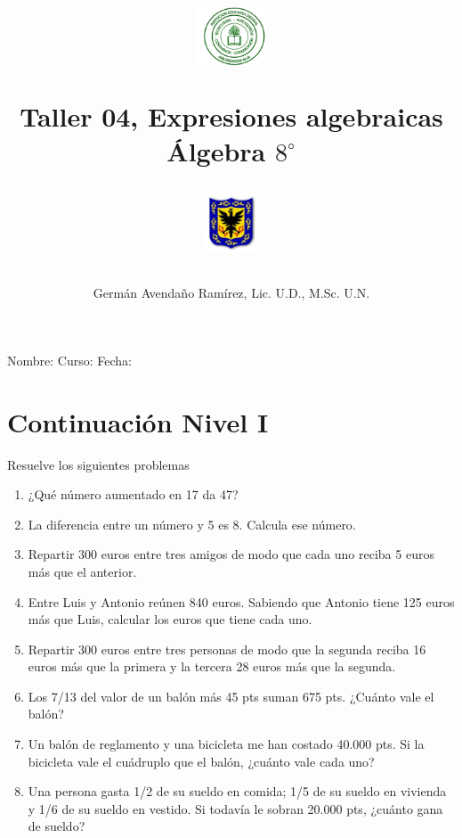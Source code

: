 \documentclass[10pt,twoside]{article}
\author{Germ\'an Avenda\~no Ram\'irez, Lic. U.D., M.Sc. U.N.}
\title{\begin{minipage}{.2\textwidth}
\includegraphics[height=1.75cm]{Images/logo-colegio.png}\end{minipage}
\begin{minipage}{.55\textwidth}
\begin{center}
Taller 04, Expresiones algebraicas \\
Álgebra $8^{\circ}$
\end{center}
\end{minipage}\hfill
\begin{minipage}{.2\textwidth}
\includegraphics[height=1.75cm]{Images/logo-sed.png} 
\end{minipage}}
\date{}
\begin{document}
\maketitle
Nombre: \hrulefill Curso: \underline{\hspace*{44pt}} Fecha: \underline{\hspace*{2.5cm}}
\section*{Continuaci\'{o}n Nivel I}
Resuelve los siguientes problemas
\begin{enumerate}
\item ¿Qué número aumentado en 17 da 47?
\item La diferencia entre un número y 5 es 8. Calcula ese número.
\item Repartir 300 euros entre tres amigos de modo que cada uno reciba 5 euros más que el anterior.
\item Entre Luis y Antonio reúnen 840 euros. Sabiendo que Antonio tiene 125 euros más que Luis, calcular los euros que tiene cada uno.
\item Repartir 300 euros entre tres personas de modo que la segunda reciba 16 euros más que la primera y la tercera 28 euros más que la segunda.
\item Los 7/13 del valor de un balón más 45 pts suman 675 pts. ¿Cuánto vale el balón?
\item Un balón de reglamento y una bicicleta me han costado 40.000 pts. Si la bicicleta vale el cuádruplo que el balón, ¿cuánto vale cada uno?
\item Una persona gasta 1/2 de su sueldo en comida; 1/5 de su sueldo en vivienda y 1/6 de su sueldo en vestido. Si todavía le sobran 20.000 pts, ¿cuánto gana de sueldo?
\end{enumerate}
\end{document}
